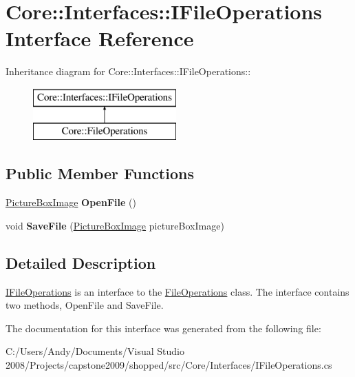 \hypertarget{interface_core_1_1_interfaces_1_1_i_file_operations}{
\section{Core::Interfaces::IFileOperations Interface Reference}
\label{interface_core_1_1_interfaces_1_1_i_file_operations}
}
Inheritance diagram for Core::Interfaces::IFileOperations::\begin{figure}[H]
\begin{center}
\leavevmode
\includegraphics[height=2cm]{interface_core_1_1_interfaces_1_1_i_file_operations}
\end{center}
\end{figure}
\subsection*{Public Member Functions}
\begin{DoxyCompactItemize}
\item 
\hypertarget{interface_core_1_1_interfaces_1_1_i_file_operations_aafc7e617b51c7fae2c256fdbdcdd90ca}{
\hyperlink{class_core_1_1_images_1_1_picture_box_image}{PictureBoxImage} {\bfseries OpenFile} ()}
\label{interface_core_1_1_interfaces_1_1_i_file_operations_aafc7e617b51c7fae2c256fdbdcdd90ca}

\item 
\hypertarget{interface_core_1_1_interfaces_1_1_i_file_operations_a254301628fd3053115f557626aa71f14}{
void {\bfseries SaveFile} (\hyperlink{class_core_1_1_images_1_1_picture_box_image}{PictureBoxImage} pictureBoxImage)}
\label{interface_core_1_1_interfaces_1_1_i_file_operations_a254301628fd3053115f557626aa71f14}

\end{DoxyCompactItemize}


\subsection{Detailed Description}
\hyperlink{interface_core_1_1_interfaces_1_1_i_file_operations}{IFileOperations} is an interface to the \hyperlink{class_core_1_1_file_operations}{FileOperations} class. The interface contains two methods, OpenFile and SaveFile. 

The documentation for this interface was generated from the following file:\begin{DoxyCompactItemize}
\item 
C:/Users/Andy/Documents/Visual Studio 2008/Projects/capstone2009/shopped/src/Core/Interfaces/IFileOperations.cs\end{DoxyCompactItemize}
